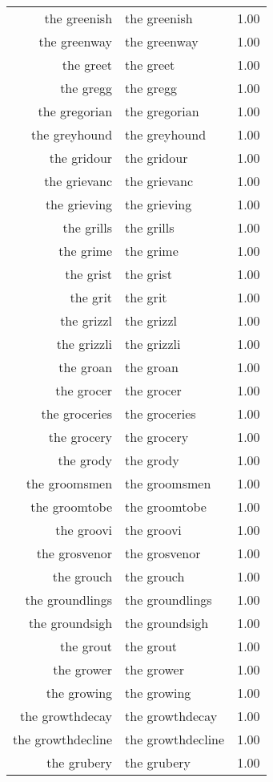 \begin{table}[ht]
\begin{tabular}{rlr}
  the greenish & the greenish & 1.00 \\ 
  the greenway & the greenway & 1.00 \\ 
  the greet & the greet & 1.00 \\ 
  the gregg & the gregg & 1.00 \\ 
  the gregorian & the gregorian & 1.00 \\ 
  the greyhound & the greyhound & 1.00 \\ 
  the gridour & the gridour & 1.00 \\ 
  the grievanc & the grievanc & 1.00 \\ 
  the grieving & the grieving & 1.00 \\ 
  the grills & the grills & 1.00 \\ 
  the grime & the grime & 1.00 \\ 
  the grist & the grist & 1.00 \\ 
  the grit & the grit & 1.00 \\ 
  the grizzl & the grizzl & 1.00 \\ 
  the grizzli & the grizzli & 1.00 \\ 
  the groan & the groan & 1.00 \\ 
  the grocer & the grocer & 1.00 \\ 
  the groceries & the groceries & 1.00 \\ 
  the grocery & the grocery & 1.00 \\ 
  the grody & the grody & 1.00 \\ 
  the groomsmen & the groomsmen & 1.00 \\ 
  the groomtobe & the groomtobe & 1.00 \\ 
  the groovi & the groovi & 1.00 \\ 
  the grosvenor & the grosvenor & 1.00 \\ 
  the grouch & the grouch & 1.00 \\ 
  the groundlings & the groundlings & 1.00 \\ 
  the groundsigh & the groundsigh & 1.00 \\ 
  the grout & the grout & 1.00 \\ 
  the grower & the grower & 1.00 \\ 
  the growing & the growing & 1.00 \\ 
  the growthdecay & the growthdecay & 1.00 \\ 
  the growthdecline & the growthdecline & 1.00 \\ 
  the grubery & the grubery & 1.00 \\ 

\end{tabular}
\end{table}
